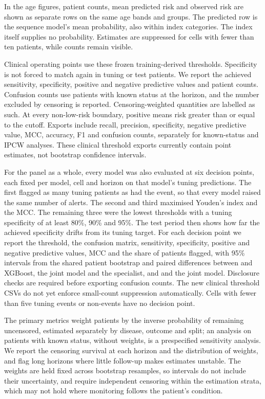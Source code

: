 In the age figures, patient counts, mean predicted risk and observed risk are
shown as separate rows on the same age bands and groups. The predicted row is
the sequence model's mean probability, also within index categories. The index itself supplies no probability. Estimates are suppressed for cells with fewer
than ten patients, while counts remain visible.

Clinical operating points use these frozen training-derived thresholds.
Specificity is not forced to match again in tuning or test patients. We report
the achieved sensitivity, specificity, positive and negative predictive values
and patient counts. Confusion counts use patients with known status at the
horizon, and the number excluded by censoring is reported. Censoring-weighted quantities are labelled as such. At every non-low-risk
boundary, positive means risk greater than or equal to the cutoff. Exports
include recall, precision, specificity, negative predictive value, MCC,
accuracy, F1 and confusion counts, separately for known-status and IPCW
analyses. These clinical threshold exports currently contain point estimates,
not bootstrap confidence intervals.

For the panel as a whole, every model was also evaluated at six decision
points, each fixed per model, cell and horizon on that model's tuning
predictions. The first flagged as many tuning patients as had the event, so
that every model raised the same number of alerts. The second and third
maximised Youden's index and the MCC. The remaining three were the lowest
thresholds with a tuning specificity of at least 80\%, 90\% and 95\%. The test
period then shows how far the achieved specificity drifts from its tuning
target. For each decision point we report the threshold, the confusion matrix,
sensitivity, specificity, positive and negative predictive values, MCC and the
share of patients flagged, with 95\% intervals from the shared patient
bootstrap and paired differences between \opera{} and XGBoost, the joint
model and the specialist, and \opera{} and the joint model. Disclosure checks are required before exporting confusion counts. The new
clinical threshold CSVs do not yet enforce small-count suppression automatically. Cells with fewer than five tuning events or non-events have no
decision point.

The primary metrics weight patients by the inverse probability of remaining
uncensored, estimated separately by disease, outcome and split; an analysis on
patients with known status, without weights, is a prespecified sensitivity
analysis. We report the censoring survival at each horizon and the distribution
of weights, and flag long horizons where little follow-up makes estimates
unstable. The weights are held fixed across bootstrap resamples, so intervals
do not include their uncertainty, and require independent censoring within the estimation strata, which may not hold where monitoring follows the patient's
condition.


